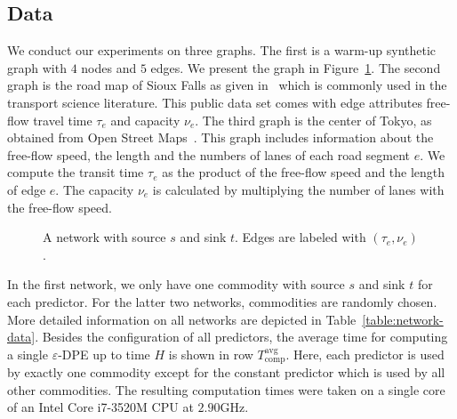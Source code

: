 \subsection{Data}

We conduct our experiments on three graphs.
The first is a warm-up synthetic graph with $4$ nodes and $5$ edges. We present the graph in Figure~\ref{fig:synthetic-network}.
The second graph is the road map of Sioux Falls as given in~\cite{LeBlanc1975} which is commonly used in the transport science literature.
This public data set comes with edge attributes free-flow travel time $\tau_e$ and capacity $\nu_e$. 
The third graph is the center of Tokyo, as obtained from Open Street Maps~\cite{openstreetmaps}. 
This graph includes information about the free-flow speed, the length and the numbers of lanes of each road segment $e$.
We compute the transit time $\tau_e$ as the product of the free-flow speed and the length of edge $e$.
The capacity $\nu_e$ is calculated by multiplying the number of lanes with the free-flow speed.

\begin{figure}
    \centering
    \caption{A network with source $s$ and sink $t$. Edges are labeled with $(\tau_e, \nu_e)$.}\label{fig:synthetic-network}
\end{figure}

In the first network, we only have one commodity with source $s$ and sink $t$ for each predictor. 
For the latter two networks, commodities are randomly chosen.
More detailed information on all networks are depicted in Table~\ref{table:network-data}.
Besides the configuration of all predictors, the average time for computing a single $\varepsilon$-DPE up to time $H$ is shown in row $T^{\mathrm{avg}}_{\mathrm{comp}}$.
Here, each predictor is used by exactly one commodity except for the constant predictor which is used by all other commodities.
The resulting computation times were taken on a single core of an Intel\textsuperscript{\textregistered} Core\textsuperscript{\texttrademark} i7-3520M CPU at $2{.}90$GHz.

